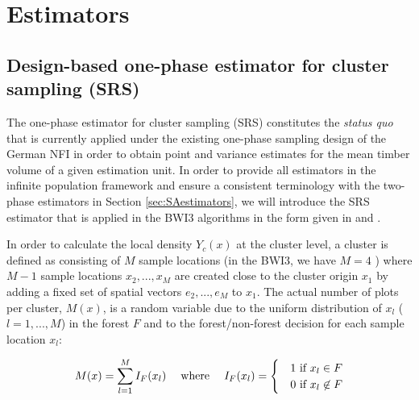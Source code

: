 
\section{Estimators}
\label{sec:estimators}


\subsection{Design-based one-phase estimator for cluster sampling (SRS)}
\label{sec:srs_estimator}

The one-phase estimator for cluster sampling (SRS) constitutes the \textit{status quo} that is currently applied under the existing one-phase sampling design of the German NFI in order to obtain point and variance estimates for the mean timber volume of a given estimation unit. In order to provide all estimators in the infinite population framework and ensure a consistent terminology with the two-phase estimators in Section \ref{sec:SAestimators}, we will introduce the SRS estimator that is applied in the BWI3 algorithms \citep{bwi3_ausw} in the form given in \citet{mandallaz2008} and \citet{mandallaz2016}.\par 
In order to calculate the local density $Y_{c}(x)$ at the cluster level, a cluster is defined as consisting of $M$ sample locations (in the BWI3, we have $M=4$ ) where $M-1$ sample locations $x_2, ..., x_M$ are created close to the cluster origin $x_1$ by adding a fixed set of spatial vectors $e_2, ..., e_M$ to $x_1$. The actual number of plots per cluster, $M(x)$, is a random variable due to the uniform distribution of $x_l$ ($l=1, ..., M$) in the forest $F$ and to the forest/non-forest decision for each sample location $x_l$:

\begin{equation}\label{eq:Mx}
M(x)=\sum_{l=1}^{M}I_{F}(x_l) \hspace{3ex} \text{where} \hspace{3ex} I_F(x_l)=\begin{cases}&1 \text{ if $x_l \in F$}\\
&0 \text{ if $x_l\not\in F$}
\end{cases}
\end{equation}

